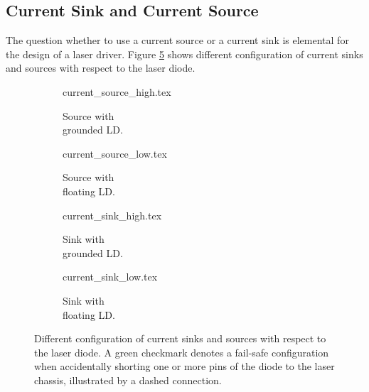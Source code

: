 \subsection{Current Sink and Current Source}

The question whether to use a current source or a current sink is elemental for the design of a laser driver. Figure \ref{fig:current_sink_source} shows different configuration of current sinks and sources with respect to the laser diode.

\begin{figure}[ht]
    \centering
    \begin{subfigure}{0.225\linewidth}
        \centering
        {current_source_high.tex}
        \caption{Source with\protect\\grounded LD.}
        \label{fig:current_source_high}
    \end{subfigure}
    \begin{subfigure}{0.225\linewidth}
        \centering
        {current_source_low.tex}
        \caption{Source with\protect\\floating LD.}
        \label{fig:current_source_low}
    \end{subfigure}
    \begin{subfigure}{0.225\linewidth}
        \centering
        {current_sink_high.tex}
        \caption{Sink with\protect\\grounded LD.}
        \label{fig:current_sink_high}
    \end{subfigure}
    \begin{subfigure}{0.225\linewidth}
        \centering
        {current_sink_low.tex}
        \caption{Sink with\protect\\floating LD.}
        \label{fig:current_sink_low}
    \end{subfigure}
    \caption{Different configuration of current sinks and sources with respect to the laser diode. A green checkmark denotes a fail-safe configuration when accidentally shorting one or more pins of the diode to the laser chassis, illustrated by a dashed connection.}
    \label{fig:current_sink_source}
\end{figure}

